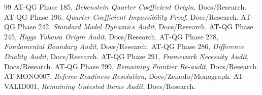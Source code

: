 \begin{thebibliography}{99}
 AT-QG Phase 185, \emph{Bekenstein Quarter Coefficient Origin}, Docs/Research.
 AT-QG Phase 196, \emph{Quarter Coefficient Impossibility Proof}, Docs/Research.
 AT-QG Phase 242, \emph{Standard Model Dynamics Audit}, Docs/Research.
 AT-QG Phase 245, \emph{Higgs Yukawa Origin Audit}, Docs/Research.
 AT-QG Phase 278, \emph{Fundamental Boundary Audit}, Docs/Research.
 AT-QG Phase 286, \emph{Difference Duality Audit}, Docs/Research.
 AT-QG Phase 291, \emph{Framework Necessity Audit}, Docs/Research.
 AT-QG Phase 299, \emph{Remaining Frontier Re-audit}, Docs/Research.
 AT-MONO007, \emph{Referee-Readiness Resolution}, Docs/Zenodo/Monograph.
 AT-VALID001, \emph{Remaining Untested Items Audit}, Docs/Research.
\end{thebibliography}
